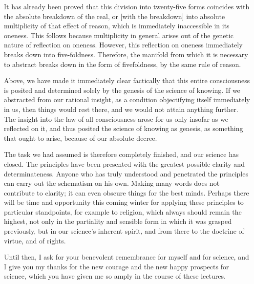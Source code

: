 It has already been proved that
this division into twenty-five forms
coincides with the absolute breakdown of the real,
or [with the breakdown] into absolute multiplicity
of that effect of reason,
which is immediately inaccessible in its oneness.
This follows because multiplicity in general
arises out of the genetic nature of reflection on oneness.
However, this reflection on oneness
immediately breaks down into five-foldness.
Therefore, the manifold from which it is necessary
to abstract breaks down in the form of fivefoldness,
by the same rule of reason.

Above, we have made it immediately clear factically that
this entire consciousness is posited and determined
solely by the genesis of the science of knowing.
If we abstracted from our rational insight,
as a condition objectifying itself immediately in us,
then things would rest there,
and we would not attain anything further.
The insight into the law of all consciousness
arose for us only insofar as we reflected on it,
and thus posited the science of knowing as genesis,
as something that ought to arise,
because of our absolute decree.

The task we had assumed is therefore completely finished,
and our science has closed.
The principles have been presented
with the greatest possible clarity and determinateness.
Anyone who has truly understood and penetrated
the principles can carry out the schematism on his own.
Making many words does not contribute to clarity;
it can even obscure things for the best minds.
Perhaps there will be time and opportunity
this coming winter for applying these principles
to particular standpoints,
for example to religion,
which always should remain the highest,
not only in the partiality and sensible form
in which it was grasped previously,
but in our science's inherent spirit,
and from there to the doctrine
of virtue, and of rights.

Until then, I ask for your benevolent
remembrance for myself and for science,
and I give you my thanks for the new courage
and the new happy prospects for science,
which you have given me so amply
in the course of these lectures.
